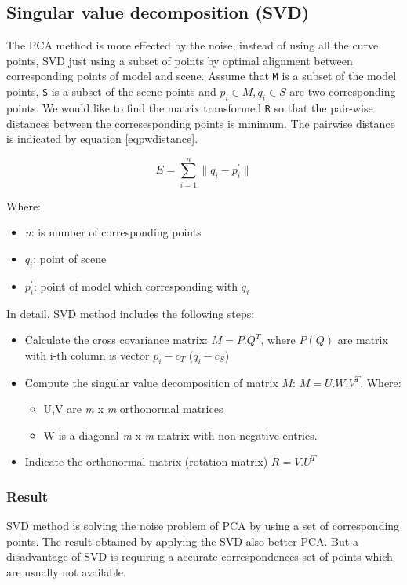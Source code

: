 \subsection{Singular value decomposition (SVD)}
The PCA method is more effected by the noise, instead of using all the curve points, SVD just using a subset of points by optimal alignment between corresponding points of model and scene. Assume that \texttt{M} is a subset of the model points, \texttt{S} is a subset of the scene points and $p_i \in M, q_i \in S$ are two corresponding points. We would like to find the matrix transformed \texttt{R} so that the pair-wise distances between the corresesponding points is minimum. The pairwise distance is indicated by equation \ref{eqpwdistance}.
\begin{center}
\begin{equation}\label{eqpwdistance}
	E = \sum_{i=1}^{n} {\|q_i - p_i^{'}\|}
\end{equation}
\end{center}
Where:
\begin{itemize}
	\item \textit{n}: is number of corresponding points
	\item \textit{$q_i$}: point of scene
	\item \textit{$p_i^{'}$}: point of model which corresponding with \texttt{$q_i$}
\end{itemize}
In detail, SVD method includes the following steps:
\begin{itemize}
	\item Calculate the cross covariance matrix: $M = P.Q^T$, where $P(Q)$ are matrix with i-th column is vector $p_i - c_T$ ($q_i - c_S$)
	\item Compute the singular value decomposition of matrix $M$: \textbf{$M = U.W.V^T$}. Where:
	\begin{itemize}
		\item U,V are \textit{m} x \textit{m} orthonormal matrices
		\item W is a diagonal \textit{m} x \textit{m} matrix with non-negative entries.
	\end{itemize}
	\item Indicate the orthonormal matrix (rotation matrix) $R = V.U^T$
\end{itemize}
\subsubsection{Result}
SVD method is solving the noise problem of PCA by using a set of corresponding points. The result obtained by applying the SVD also better PCA. But a disadvantage of SVD is requiring a accurate correspondences set of points which are usually not available.
